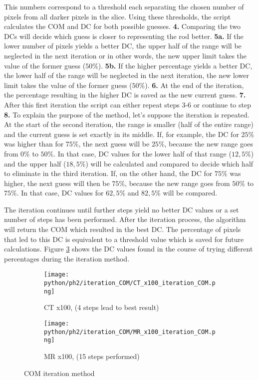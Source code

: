 This numbers correspond to a threshold each separating the chosen number of pixels from all darker pixels in the slice.
Using these thresholds, the script calculates the COM and DC for both possible guesses.
\textbf{4.} Comparing the two DCs will decide which guess is closer to representing the rod better.
\textbf{5a.} If the lower number of pixels yields a better DC, the upper half of the range will be neglected in the next iteration or in other words, the new upper limit takes the value of the former guess ($50\%$).
\textbf{5b.} If the higher percentage yields a better DC, the lower half of the range will be neglected in the next iteration, the new lower limit takes the value of the former guess ($50\%$).
\textbf{6.} At the end of the iteration, the percentage resulting in the higher DC is saved as the new current guess.
\textbf{7.} After this first iteration the script can either repeat steps 3-6 or continue to step \textbf{8.}
To explain the purpose of the method, let's suppose the iteration is repeated.
At the start of the second iteration, the range is smaller (half of the entire range) and the current guess is set exactly in its middle.
If, for example, the DC for $25\%$ was higher than for $75\%$, the next guess will be $25\%$, because the new range goes from $0\%$ to $50\%$.
In that case, DC values for the lower half of that range ($12,5\%$) and the upper half ($18,5\%$) will be calculated and compared to decide which half to eliminate in the third iteration.
If, on the other hand, the DC for $75\%$ was higher, the next guess will then be $75\%$, because the new range goes from $50\%$ to $75\%$.
In that case, DC values for $62,5\%$ and $82,5\%$ will be compared.

The iteration continues until further steps yield no better DC values or a set number of steps has been performed.
After the iteration process, the algorithm will return the COM which resulted in the best DC.
The percentage of pixels that led to this DC is equivalent to a threshold value which is saved for future calculations.
Figure \ref{fig:COM_iteration} shows the DC values found in the course of trying different percentages during the iteration method.


\begin{figure}[!thb]
  \begin{subfigure}[b]{1\textwidth}
    \texttt{[image: python/ph2/iteration\_COM/CT\_x100\_iteration\_COM.png]}
    \caption{CT x100, (4 steps lead to best result)}
    \label{fig:CT_x100_iteration}
  \end{subfigure}
  \begin{subfigure}[b]{1\textwidth}
    \texttt{[image: python/ph2/iteration\_COM/MR\_x100\_iteration\_COM.png]}
     \caption{MR x100, (15 steps performed)}
     \label{fig:MR_x100_iteration}
  \end{subfigure}
  \caption{COM iteration method}
  \label{fig:COM_iteration}
\end{figure}

